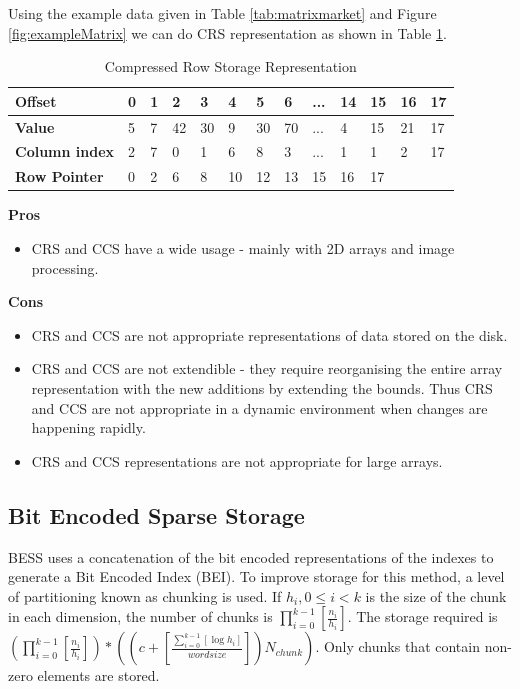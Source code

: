  Using the example data given in Table \ref{tab:matrixmarket} and Figure \ref{fig:exampleMatrix} we can do CRS representation as shown in Table \ref{tab:compressed}.
 
  \begin{table}[H]
 	\caption{Compressed Row Storage Representation\label{tab:compressed}}
 	\begin{center}
 		\begin{tabular}{lllllllllllll}
 			\hline
 			{\textbf{Offset}} & 0 & 1 & 2 & 3 & 4 & 5 & 6 & ...& 14 & 15 & 16 & 17\\
 			\hline
 			{\textbf{Value}} & 5 & 7 & 42 & 30 & 9 & 30 & 70 & ...& 4 & 15 & 21 & 17 \\
 			{\textbf{Column index}} & 2 & 7 & 0 & 1 & 6 & 8 & 3 & ... & 1 & 1 & 2 & 17\\
 			{\textbf{Row Pointer}} & 0 & 2 & 6 & 8 & 10 & 12 & 13 & 15 & 16 & 17 & & \\
 			\hline
 		\end{tabular}
 	\end{center}
 \end{table}

\textbf{Pros}
\begin{itemize}
	\item CRS and CCS have a wide usage - mainly with 2D arrays and image processing.
\end{itemize}

\textbf{Cons}
\begin{itemize}
	\item CRS and CCS are not appropriate representations of data stored on the disk.
	\item CRS and CCS are not extendible - they require reorganising the entire array representation with the new additions by extending the bounds. Thus CRS and CCS are not appropriate in a dynamic environment when changes are happening rapidly.
	\item CRS and CCS representations are not appropriate for large arrays.
\end{itemize}

\subsection{Bit Encoded Sparse Storage}
BESS uses a concatenation of the bit encoded representations of the indexes to generate a Bit Encoded Index (BEI). To improve storage for this method, a level of partitioning known as chunking is used. If $h_i, 0\leq i < k$ is the size of the chunk in each dimension, the number of chunks is $\prod_{i=0}^{k-1}[\frac{n_i}{h_i}]$. The storage required is $(\prod_{i=0}^{k-1}[\frac{n_i}{h_i}])*((c+ [\frac{\sum_{i=0}^{k-1}[\log h_i]}{wordsize}])N_{chunk})$. Only chunks that contain non-zero elements are stored.

